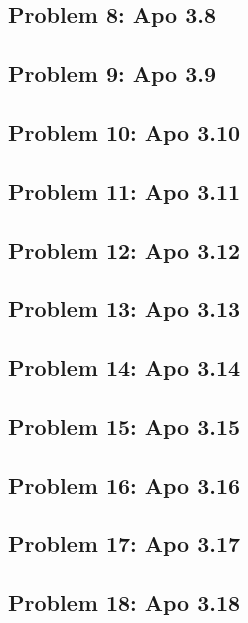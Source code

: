 \subsection[Problem 8]{Problem 8: Apo 3.8}

\subsection[Problem 9]{Problem 9: Apo 3.9}

\subsection[Problem 10]{Problem 10: Apo 3.10}

\subsection[Problem 11]{Problem 11: Apo 3.11}

\subsection[Problem 12]{Problem 12: Apo 3.12}

\subsection[Problem 13]{Problem 13: Apo 3.13}

\subsection[Problem 14]{Problem 14: Apo 3.14}

\subsection[Problem 15]{Problem 15: Apo 3.15}

\subsection[Problem 16]{Problem 16: Apo 3.16}

\subsection[Problem 17]{Problem 17: Apo 3.17}

\subsection[Problem 18]{Problem 18: Apo 3.18}

